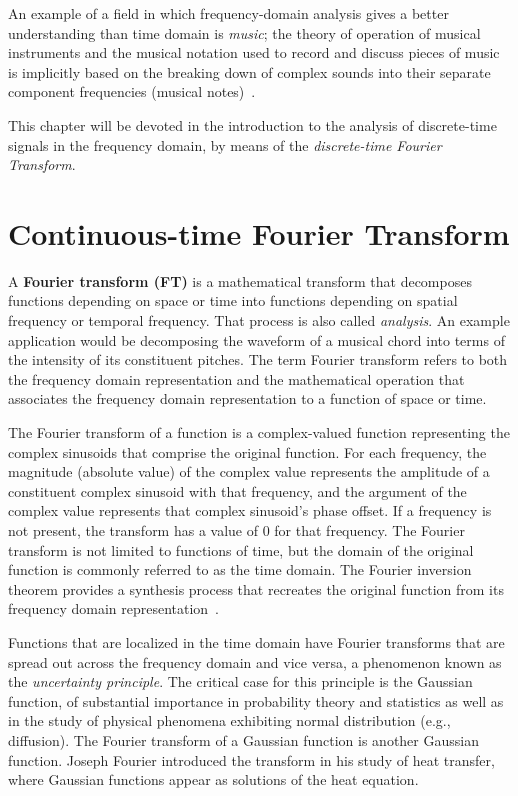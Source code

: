 \documentclass[\documentfontsize, twocolumn]{\classname}
\begin{document}
An example of a field in which frequency-domain analysis gives a better understanding than time domain is \emph{music}; the theory of operation of musical instruments and the musical notation used to record and discuss pieces of music is implicitly based on the breaking down of complex sounds into their separate component frequencies (musical notes)~\cite{bib:frequencyDomain}.

This chapter will be devoted in the introduction to the analysis of discrete-time signals in the frequency domain, by means of the \emph{discrete-time Fourier Transform}.


\section{Continuous-time Fourier Transform}\label{sec:continuousTimeFourierTransform}

A \textbf{Fourier transform (FT)} is a mathematical transform that decomposes
functions depending on space or time into functions depending on spatial
frequency or temporal frequency. That process is also called \emph{analysis}.
An example application would be decomposing the waveform of a musical chord
into terms of the intensity of its constituent pitches. The term Fourier
transform refers to both the frequency domain representation and the
mathematical operation that associates the frequency domain representation to a
function of space or time.

The Fourier transform of a function is a complex-valued function representing
the complex sinusoids that comprise the original function. For each frequency,
the magnitude (absolute value) of the complex value represents the amplitude of
a constituent complex sinusoid with that frequency, and the argument of the
complex value represents that complex sinusoid's phase offset. If a frequency
is not present, the transform has a value of 0 for that frequency. The Fourier
transform is not limited to functions of time, but the domain of the original
function is commonly referred to as the time domain. The Fourier inversion
theorem provides a synthesis process that recreates the original function from
its frequency domain representation~\cite{bib:fourierTransform}.

Functions that are localized in the time domain have Fourier transforms that
are spread out across the frequency domain and vice versa, a phenomenon known
as the \emph{uncertainty principle}. The critical case for this principle is
the Gaussian function, of substantial importance in probability theory and
statistics as well as in the study of physical phenomena exhibiting normal
distribution (e.g., diffusion). The Fourier transform of a Gaussian function is
another Gaussian function. Joseph Fourier introduced the transform in his study
of heat transfer, where Gaussian functions appear as solutions of the heat
equation.
\end{document}
